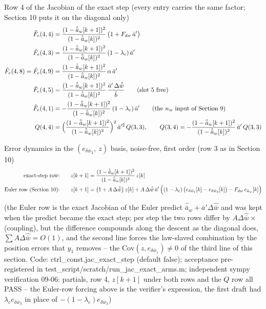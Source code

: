 \documentclass[11pt,a4paper,fontset=none]{ctexart}
\newcommand{\ba}{\bar{a}}
\newcommand{\bw}{\bar{w}}
\newcommand{\dWh}{\Delta\hat{\bw}}
\newcommand{\ap}{\ba'}
\begin{document}
Row 4 of the Jacobian of the exact step (every entry carries the same factor; Section 10 puts it on the diagonal only)
\begin{align*}
\tilde F_e(4,4) &= \frac{(1-\hat{\ba}_w[k+1])^{2}}{(1-\hat{\ba}_w[k])^{2}}\,\bigl(1 + F_{dw}\,\ap\bigr) \\
\tilde F_e(4,3) &= \frac{(1-\hat{\ba}_w[k+1])^{2}}{(1-\hat{\ba}_w[k])^{2}}\,(1-\lambda_c)\,\ap \\
\tilde F_e(4,8) = \tilde F_e(4,9) &= \frac{(1-\hat{\ba}_w[k+1])^{2}}{(1-\hat{\ba}_w[k])^{2}}\,\alpha\,\ap \\
\tilde F_e(4,5) &= \frac{(1-\hat{\ba}_w[k+1])^{2}}{(1-\hat{\ba}_w[k])^{2}}\,\frac{\ap\,\dWh}{\hat b} \qquad (\text{slot 5 free}) \\
\tilde F_e(4,1) &= -\frac{(1-\hat{\ba}_w[k+1])^{2}}{(1-\hat{\ba}_w[k])^{2}}\,(1-\lambda_c)\,\ap \qquad (\text{the } n_w \text{ input of Section 9}) \\
Q(4,4) &= \Bigl(\frac{(1-\hat{\ba}_w[k+1])^{2}}{(1-\hat{\ba}_w[k])^{2}}\Bigr)^{2}\,\ap^{2}\,Q(3,3) , \qquad
Q(3,4) = -\frac{(1-\hat{\ba}_w[k+1])^{2}}{(1-\hat{\ba}_w[k])^{2}}\,\ap\,Q(3,3)
\end{align*}

Error dynamics in the $(e_{\delta\bw_3},\ z)$ basis, noise-free, first order (row 3 as in Section 10)
\begin{align*}
\text{exact-step row:}\qquad z[k+1] &= \frac{(1-\hat{\ba}_w[k+1])^{2}}{(1-\hat{\ba}_w[k])^{2}}\,z[k] \\
\text{Euler row (Section 10):}\qquad z[k+1] &= \bigl(1 + A\,\dWh\bigr)\,z[k]
  + A\,\dWh\,\ap\,\Bigl((1-\lambda_c)\,\bigl(e_{\delta\bw_1}[k] - e_{\delta\bw_3}[k]\bigr) - F_{dw}\,e_{\ba_w}[k]\Bigr)
\end{align*}

(the Euler row is the exact Jacobian of the Euler predict $\hat{\ba}_w + \ap\dWh$ and was kept when the predict became the exact step;
per step the two rows differ by $A\dWh\times$(coupling), but the difference compounds along the descent as the diagonal does,
$\sum A\dWh = O(1)$, and the second line forces the law-slaved combination by the position errors that $y_1$ removes -- the
$\mathrm{Cov}(z, e_{\delta\bw_1}) \neq 0$ of the third line of this section. Code: ctrl\_const.jac\_exact\_step (default false);
acceptance pre-registered in test\_script/scratch/run\_jac\_exact\_arms.m; independent sympy verification 09-06: partials, row 4, $z[k+1]$ under both rows and the $Q$ row all PASS -- the Euler-row forcing above is the verifier's expression, the first draft had $\lambda_c e_{\delta\bw_3}$ in place of $-(1-\lambda_c)e_{\delta\bw_3}$)
\end{document}
